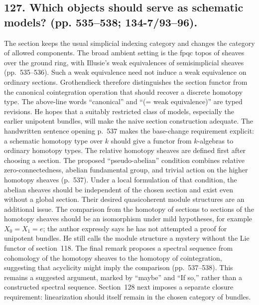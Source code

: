 \documentclass[10pt,oneside]{book}
\begin{document}
\subsection*{127. Which objects should serve as schematic models? (pp. 535--538; 134-7/93--96).}
The section keeps the usual simplicial indexing category and changes the category of allowed components. The broad ambient setting is the fpqc topos of sheaves over the ground ring, with Illusie's weak equivalences of semisimplicial sheaves (pp.~535--536). Such a weak equivalence need not induce a weak equivalence on ordinary sections. Grothendieck therefore distinguishes the section functor from the canonical cointegration operation that should recover a discrete homotopy type. The above-line words ``canonical'' and ``(= weak equivalence)'' are typed revisions. He hopes that a suitably restricted class of models, especially the earlier unipotent bundles, will make the naive section construction adequate. The handwritten sentence opening p.~537 makes the base-change requirement explicit: a schematic homotopy type over $k$ should give a functor from $k$-algebras to ordinary homotopy types. The relative homotopy sheaves are defined first after choosing a section. The proposed ``pseudo-abelian'' condition combines relative zero-connectedness, abelian fundamental group, and trivial action on the higher homotopy sheaves (p.~537). Under a local formulation of that condition, the abelian sheaves should be independent of the chosen section and exist even without a global section. Their desired quasicoherent module structures are an additional issue. The comparison from the homotopy of sections to sections of the homotopy sheaves should be an isomorphism under mild hypotheses, for example $X_0=X_1=e$; the author expressly says he has not attempted a proof for unipotent bundles. He still calls the module structure a mystery without the Lie functor of section~118. The final remark proposes a spectral sequence from cohomology of the homotopy sheaves to the homotopy of cointegration, suggesting that acyclicity might imply the comparison (pp.~537--538). This remains a suggested argument, marked by ``maybe'' and ``If so,'' rather than a constructed spectral sequence. Section~128 next imposes a separate closure requirement: linearization should itself remain in the chosen category of bundles.
\end{document}
